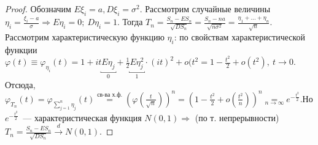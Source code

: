 	\begin{proof}
		Обозначим \(E\xi_i = a, D\xi_i = \sigma^2.\)
		Рассмотрим случайные величины \(\eta_i = \frac{\xi_i - a}{\sigma} \Rightarrow 
		E\eta_i = 0; ~ D\eta_i = 1.\)
		Тогда \(T_n = \frac{S_n - ES_n}{\sqrt{DS_n}} = \frac{S_n - na}{\sqrt{n\sigma^2}} = \frac{\eta_1 + \ldots + \eta_n}{\sqrt{n}}.\)
		Рассмотрим характеристическую функцию \(\eta_i\): по свойствам характеристической функции \(\varphi(t) \equiv \varphi_{\eta_i}(t) = 1 + it\underbracket{E\eta_j}_{0} + \frac{1}{2}\underbracket{E\eta_j^2}_1\cdot(it)^2 + o(t^2 = 1 - \frac{t^2}{2} + o(t^2), ~ t \to 0.\) Отсюда, \(\varphi_{T_n}(t) = \varphi_{\sum\limits_{j = 1}^{n}\eta_j}(t) \overset{\text{св-ва х.ф.}}{=} \left(\varphi\left(\frac{t}{\sqrt{n}}\right)\right)^n = \left(1 - \frac{t^2}{2} + o\left(\frac{t^2}{n}\right)\right)^n \underset{n \to \infty}{=} e^{- \frac{t^2}{2}}. \)Но \(e^{-\frac{t^2}{2}}\)~--- характеристическая функция \(N(0,1) \Rightarrow\) (по т. непрерывности) \(T_n = \frac{S_n - ES_n}{\sqrt{DS_n}} \overset{d}{\longrightarrow} N(0,1).\)
	\end{proof}